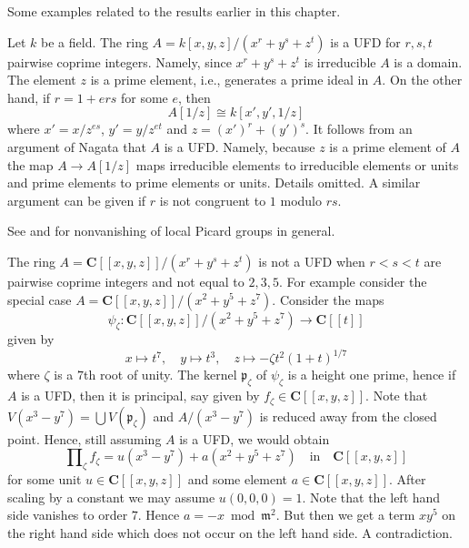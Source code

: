 \noindent
Some examples related to the results earlier in this chapter.

\begin{example}
\label{example-factorial}
\begin{reference}
\cite[4(c)]{Samuel-UFD}
\end{reference}
Let $k$ be a field. The ring $A = k[x, y, z]/(x^r + y^s + z^t)$
is a UFD for $r, s, t$ pairwise coprime integers. Namely, since
$x^r + y^s + z^t$ is irreducible $A$ is a domain. The element $z$
is a prime element, i.e., generates a prime ideal in $A$.
On the other hand, if $r = 1 + ers$ for some $e$, then
$$
A[1/z] \cong k[x', y', 1/z]
$$
where $x' = x/z^{es}$, $y' = y/z^{et}$ and $z = (x')^r + (y')^s$.
It follows from an argument of Nagata that $A$ is a UFD. Namely,
because $z$ is a prime element of $A$ the map $A \to A[1/z]$ maps
irreducible elements to irreducible elements or units and prime elements
to prime elements or units. Details omitted.
A similar argument can be given if $r$ is not congruent to $1$
modulo $rs$.
\end{example}

\begin{example}
\label{example-completion-not-factorial}
\begin{reference}
See \cite{Brieskorn} and \cite{Lipman-rational} for nonvanishing of
local Picard groups in general.
\end{reference}
The ring $A = \mathbf{C}[[x, y, z]]/(x^r + y^s + z^t)$
is not a UFD when $r < s < t$ are pairwise coprime integers
and not equal to $2, 3, 5$. For example consider the special
case $A = \mathbf{C}[[x, y, z]]/(x^2 + y^5 + z^7)$.
Consider the maps
$$
\psi_\zeta : \mathbf{C}[[x, y, z]]/(x^2 + y^5 + z^7) \to \mathbf{C}[[t]]
$$
given by
$$
x \mapsto t^7,\quad
y \mapsto t^3,\quad
z \mapsto -\zeta t^2(1 + t)^{1/7}
$$
where $\zeta$ is a $7$th root of unity. The kernel $\mathfrak p_\zeta$
of $\psi_\zeta$ is a height one prime, hence if $A$ is a UFD, then
it is principal, say given by $f_\zeta \in \mathbf{C}[[x, y, z]]$.
Note that $V(x^3 - y^7) = \bigcup V(\mathfrak p_\zeta)$
and $A/(x^3 - y^7)$ is reduced away from the closed point. Hence,
still assuming $A$ is a UFD, we would obtain
$$
\prod\nolimits_\zeta f_\zeta = u(x^3 - y^7) + a(x^2 + y^5 + z^7)
\quad\text{in}\quad
\mathbf{C}[[x, y, z]]
$$
for some unit $u \in \mathbf{C}[[x, y, z]]$ and some
element $a \in \mathbf{C}[[x, y, z]]$. After scaling by a constant
we may assume $u(0, 0, 0) = 1$. Note that the left hand side vanishes to
order $7$. Hence $a = - x \bmod \mathfrak m^2$. But then we get a term
$xy^5$ on the right hand side which does not occur on the left
hand side. A contradiction.
\end{example}


